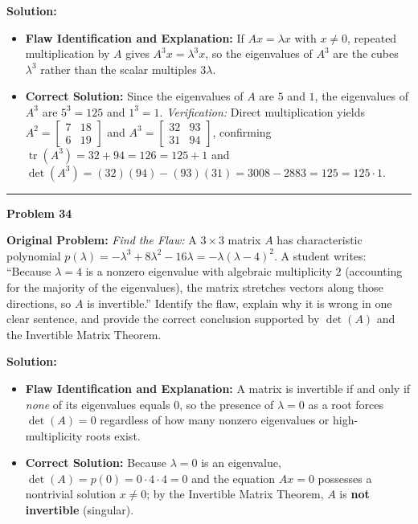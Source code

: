 \documentclass[11pt, letterpaper]{article}
\theoremstyle{definition}
\theoremstyle{remark}
\begin{document}
\textbf{Solution:}
\begin{itemize}[topsep=3pt, itemsep=3pt]
    \item \textbf{Flaw Identification and Explanation:} If $Ax = \lambda x$ with $x \neq 0$, repeated multiplication by $A$ gives $A^3 x = \lambda^3 x$, so the eigenvalues of $A^3$ are the cubes $\lambda^3$ rather than the scalar multiples $3\lambda$.
    \item \textbf{Correct Solution:} Since the eigenvalues of $A$ are $5$ and $1$, the eigenvalues of $A^3$ are $5^3 = 125$ and $1^3 = 1$.
    \textit{Verification:} Direct multiplication yields $A^2 = \begin{bmatrix} 7 & 18 \\ 6 & 19 \end{bmatrix}$ and $A^3 = \begin{bmatrix} 32 & 93 \\ 31 & 94 \end{bmatrix}$, confirming $\operatorname{tr}(A^3) = 32 + 94 = 126 = 125 + 1$ and $\det(A^3) = (32)(94) - (93)(31) = 3008 - 2883 = 125 = 125 \cdot 1$.
\end{itemize}

\noindent\rule{\textwidth}{0.4pt}

\noindent\textbf{Problem 34}

\textbf{Original Problem:} \textit{Find the Flaw:} A $3 \times 3$ matrix $A$ has characteristic polynomial $p(\lambda) = -\lambda^3 + 8\lambda^2 - 16\lambda = -\lambda(\lambda - 4)^2$. A student writes: ``Because $\lambda = 4$ is a nonzero eigenvalue with algebraic multiplicity $2$ (accounting for the majority of the eigenvalues), the matrix stretches vectors along those directions, so $A$ is invertible.'' Identify the flaw, explain why it is wrong in one clear sentence, and provide the correct conclusion supported by $\det(A)$ and the Invertible Matrix Theorem.

\textbf{Solution:}
\begin{itemize}[topsep=3pt, itemsep=3pt]
    \item \textbf{Flaw Identification and Explanation:} A matrix is invertible if and only if \textit{none} of its eigenvalues equals $0$, so the presence of $\lambda = 0$ as a root forces $\det(A) = 0$ regardless of how many nonzero eigenvalues or high-multiplicity roots exist.
    \item \textbf{Correct Solution:} Because $\lambda = 0$ is an eigenvalue, $\det(A) = p(0) = 0 \cdot 4 \cdot 4 = 0$ and the equation $Ax = 0$ possesses a nontrivial solution $x \neq 0$; by the Invertible Matrix Theorem, $A$ is \textbf{not invertible} (singular).
\end{itemize}
\end{document}

